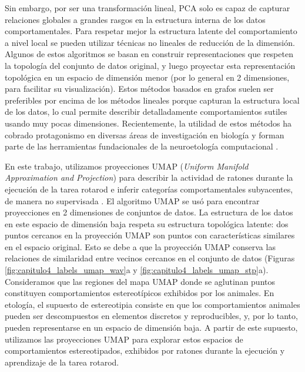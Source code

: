 Sin embargo, por ser una transformación lineal, PCA solo es capaz de capturar relaciones globales a grandes rasgos en la estructura interna de los datos comportamentales. Para respetar mejor la estructura latente del comportamiento a nivel local se pueden utilizar técnicas no lineales de reducción de la dimensión. Algunos de estos algoritmos se basan en construir representaciones que respeten la topología del conjunto de datos original, y luego proyectar esta representación topológica en un espacio de dimensión menor (por lo general en 2 dimensiones, para facilitar su visualización). Estos métodos basados en grafos suelen ser preferibles por encima de los métodos lineales porque capturan la estructura local de los datos, lo cual permite describir detalladamente comportamientos sutiles usando muy pocas dimensiones. Recientemente, la utilidad de estos métodos ha cobrado protagonismo en diversas áreas de investigación en biología y forman parte de las herramientas fundacionales de la neuroetología computacional \cite{sainburg_birdsong_umap}.

En este trabajo, utilizamos proyecciones UMAP (\textit{Uniform Manifold Approximation and Projection}) para describir la actividad de ratones durante la ejecución de la tarea rotarod e inferir categorías comportamentales subyacentes, de manera no supervisada \cite{mcinnes_umap}. El algoritmo UMAP se usó para encontrar proyecciones en 2 dimensiones de conjuntos de datos. La estructura de los datos en este espacio de dimensión baja respeta su estructura topológica latente: dos puntos cercanos en la proyección UMAP son puntos con características similares en el espacio original. Esto se debe a que la proyección UMAP conserva las relaciones de similaridad entre vecinos cercanos en el conjunto de datos (Figuras \ref{fig:capitulo4_labels_umap_wav}a y \ref{fig:capitulo4_labels_umap_stp}a). Consideramos que las regiones del mapa UMAP donde se aglutinan puntos constituyen comportamientos estereotípicos exhibidos por los animales. En etología, el supuesto de estereotipia consiste en que los comportamientos animales pueden ser descompuestos en elementos discretos y reproducibles, y, por lo tanto, pueden representarse en un espacio de dimensión baja. A partir de este supuesto, utilizamos las proyecciones UMAP para explorar estos espacios de comportamientos estereotipados, exhibidos por ratones durante la ejecución y aprendizaje de la tarea rotarod.

